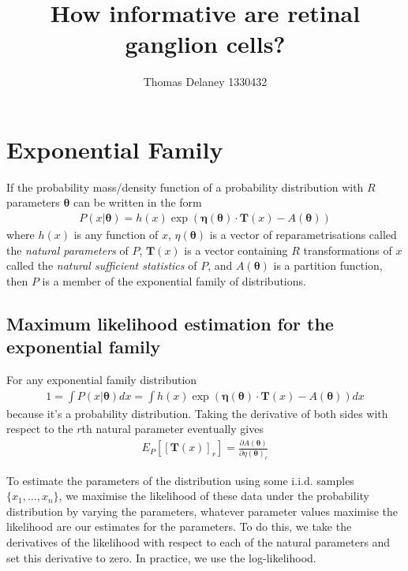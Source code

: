 \documentclass[a4paper,12pt]{article}
\title{How informative are retinal ganglion cells?}
\author{Thomas Delaney 1330432}
\theoremstyle{definition}
\newcommand{\pdiff}[2]{\frac{\partial #1}{\partial #2}} %
\begin{document}
\section{Exponential Family}
If the probability mass/density function of a probability distribution with $R$ parameters $\boldsymbol{\theta}$ can be written in the form 
\begin{align}\label{eq:exponential_family_definition}
  P(x | \boldsymbol{\theta}) = h(x) \exp \left( \boldsymbol{\eta}(\boldsymbol{\theta}) \cdot \mathbf{T}(x) - A(\boldsymbol{\theta}) \right)
\end{align}
where $h(x)$ is any function of $x$, $\eta(\boldsymbol{\theta})$ is a vector of reparametrisations called the \textit{natural parameters} of $P$, $\mathbf{T}(x)$ is a vector containing $R$ transformations of $x$ called the \textit{natural sufficient statistics} of $P$, and $A(\boldsymbol{\theta})$ is a partition function, then $P$ is a member of the exponential family of distributions.

\subsection{Maximum likelihood estimation for the exponential family}
For any exponential family distribution 
\begin{align}
  1 = \int P(x | \boldsymbol{\theta}) dx = \int h(x) \exp \left( \boldsymbol{\eta}(\boldsymbol{\theta}) \cdot \mathbf{T}(x) - A(\boldsymbol{\theta}) \right) dx
\end{align}
because it's a probability distribution. Taking the derivative of both sides with respect to the $r$th natural parameter eventually gives
\begin{align}
  E_P \left[ [\mathbf{T}(x)]_r \right] = \pdiff{A(\boldsymbol{\theta})}{\eta(\boldsymbol{\theta})_r} 
\end{align}

To estimate the parameters of the distribution using some i.i.d. samples $\lbrace x_1, \dots, x_n \rbrace$, we maximise the likelihood of these data under the probability distribution by varying the parameters, whatever parameter values maximise the likelihood are our estimates for the parameters. To do this, we take the derivatives of the likelihood with respect to each of the natural parameters and set this derivative to zero. In practice, we use the log-likelihood. 
\end{document}
